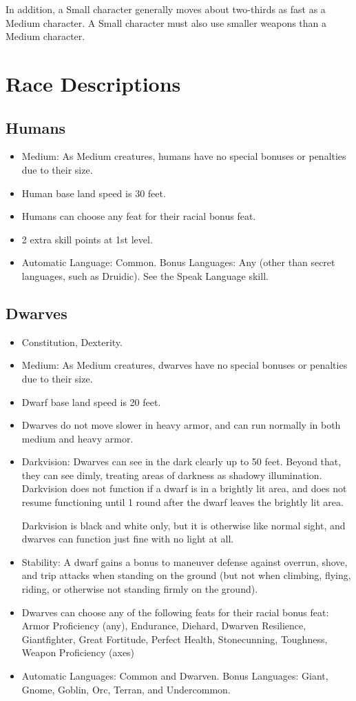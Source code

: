 In addition, a Small character generally moves about two-thirds as fast as a Medium character. A Small character must also use smaller weapons than a Medium character.

\section{Race Descriptions}

\subsection{Humans}
\begin{itemize}
\item Medium: As Medium creatures, humans have no special bonuses or penalties due to their size.
\item Human base land speed is 30 feet.
\item Humans can choose any feat for their racial bonus feat.
\item 2 extra skill points at 1st level.
\item Automatic Language: Common. Bonus Languages: Any (other than secret languages, such as Druidic). See the Speak Language skill.
\end{itemize}

\subsection{Dwarves}
\begin{itemize}
\item {} Constitution,  Dexterity.
\item Medium: As Medium creatures, dwarves have no special bonuses or penalties due to their size.
\item Dwarf base land speed is 20 feet.
\item Dwarves do not move slower in heavy armor, and can run normally in both medium and heavy armor.
\item Darkvision: Dwarves can see in the dark clearly up to 50 feet.   Beyond that, they can see dimly, treating areas of darkness as shadowy illumination. Darkvision does not function if a dwarf is in a brightly lit area, and does not resume functioning until 1 round after the dwarf leaves the brightly lit area.
\par Darkvision is black and white only, but it is otherwise like normal sight, and dwarves can function just fine with no light at all.
\item Stability: A dwarf gains a  bonus to maneuver defense against overrun, shove, and trip attacks when standing on the ground (but not when climbing, flying, riding, or otherwise not standing firmly on the ground).
\item Dwarves can choose any of the following feats for their racial bonus feat: Armor Proficiency (any), Endurance, Diehard, Dwarven Resilience, Giantfighter, Great Fortitude, Perfect Health, Stonecunning, Toughness, Weapon Proficiency (axes)
\item Automatic Languages: Common and Dwarven. Bonus Languages: Giant, Gnome, Goblin, Orc, Terran, and Undercommon.
\end{itemize}

